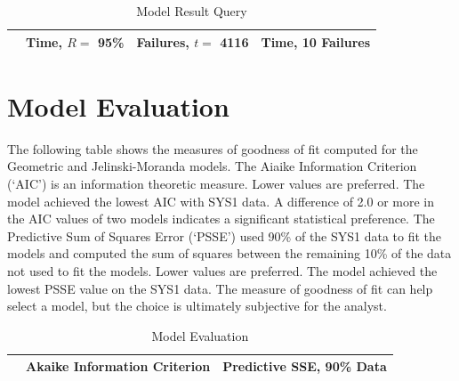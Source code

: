 \documentclass{article}
\begin{document}
\begin{table}[h!]
\centering
\caption{Model Result Query}
\begin{tabular}{llll}
\hline
   & Time, $R=$ 95\% & Failures, $t =$ 4116  & Time, 10 Failures \\ \hline

\hline
\end{tabular}
\end{table}


\newpage


\section{Model Evaluation}
The following table shows the measures of goodness of fit computed for the Geometric and Jelinski-Moranda models. The Aiaike Information Criterion (`AIC') is an information theoretic measure. Lower values are preferred. The  model achieved the lowest AIC with SYS1 data. A difference of 2.0 or more in the AIC values of two models indicates a significant statistical preference. The Predictive Sum of Squares Error (`PSSE') used 90\% of the SYS1 data to fit the models and computed the sum of squares between the remaining 10\% of the data not used to fit the models. Lower values are preferred. The  model achieved the lowest PSSE value on the SYS1 data. The measure of goodness of fit can help select a model, but the choice is ultimately subjective for the analyst.

\begin{table}[h!]
\centering
\caption{Model Evaluation}
\begin{tabular}{lll}
\hline
 &  Akaike Information Criterion & Predictive SSE, 90\% Data \\ \hline

\hline
\end{tabular}
\end{table}
\end{document}
